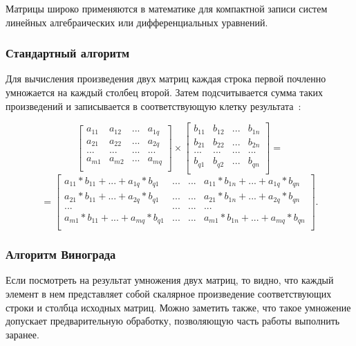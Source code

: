 \documentclass[a4paper,12pt]{article}
\begin{document}
		
	Матрицы широко применяются в математике для компактной записи систем линейных алгебраических или дифференциальных уравнений.
	
	    \subsubsection{Стандартный алгоритм}
	Для вычисления произведения двух матриц каждая строка первой
почленно умножается на каждый столбец второй. Затем подсчитывается сумма таких произведений и записывается в соответствующую клетку результата~\cite{makkonell}:

\[ \begin{bmatrix}
a_{11} & a_{12} & ... & a_{1q}\\
a_{21} & a_{22} & ... & a_{2q}\\
... & ... & ... & ...\\
a_{m1} & a_{m2} & ... & a_{mq}\\
\end{bmatrix} \times 
\begin{bmatrix}
b_{11} & b_{12} & ... & b_{1n}\\
b_{21} & b_{22} & ... & b_{2n}\\
... & ... & ... & ...\\
b_{q1} & b_{q2} & ... & b_{qn}\\
\end{bmatrix} = \]
\[=\begin{bmatrix}
a_{11}*b_{11} + ... + a_{1q}*b_{q1} & ... & ... & a_{11}*b_{1n} + ... + a_{1q}*b_{qn}\\
a_{21}*b_{11} + ... + a_{2q}*b_{q1} & ... & ... & a_{21}*b_{1n} + ... + a_{2q}*b_{qn}\\
... & ... & ... & ...\\
a_{m1}*b_{11} + ... + a_{mq}*b_{q1} & ... & ... & a_{m1}*b_{1n} + ... + a_{mq}*b_{qn}\\
\end{bmatrix}. \]
		     		
		    
	  	\subsubsection{Алгоритм Винограда}
		Если посмотреть на результат умножения двух матриц, то видно,
что каждый элемент в нем представляет собой скалярное произведение
соответствующих строки и столбца исходных матриц. Можно заметить
также, что такое умножение допускает предварительную обработку,
позволяющую часть работы выполнить заранее.
	
\end{document}
